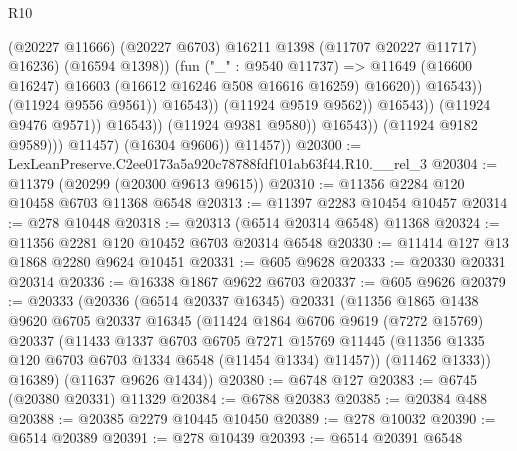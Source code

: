 \begin{lexlean}{R10}
\begin{coremodule}
                                                  (@20227 @11666)
                                                  (@20227 @6703)
                                                  @16211
                                                  @1398
                                                  (@11707 @20227 @11717)
                                                  @16236)
                                                (@16594 @1398))
                                              (fun ("_" : @9540 @11737) =>
                                              @11649
                                                (@16600 @16247)
                                                @16603
                                                (@16612 @16246 @508 @16616 @16259)
                                                @16620))
                                            @16543))
                                        (@11924 @9556 @9561))
                                      @16543))
                                  (@11924 @9519 @9562))
                                @16543))
                            (@11924 @9476 @9571))
                          @16543))
                      (@11924 @9381 @9580))
                    @16543))
                (@11924 @9182 @9589)))
            @11457)
          (@16304 @9606))
        @11457))
@20300 := LexLeanPreserve.C2ee0173a5a920c78788fdf101ab63f44.R10.__rel_3
@20304 := @11379 (@20299 (@20300 @9613 @9615))
@20310 := @11356 @2284 @120 @10458 @6703 @11368 @6548
@20313 := @11397 @2283 @10454 @10457
@20314 := @278 @10448
@20318 := @20313 (@6514 @20314 @6548) @11368
@20324 := @11356 @2281 @120 @10452 @6703 @20314 @6548
@20330 := @11414 @127 @13 @1868 @2280 @9624 @10451
@20331 := @605 @9628
@20333 := @20330 @20331 @20314
@20336 := @16338 @1867 @9622 @6703
@20337 := @605 @9626
@20379 := @20333
    (@20336
      (@6514 @20337 @16345)
      @20331
      (@11356
        @1865
        @1438
        @9620
        @6705
        @20337
        @16345
        (@11424
          @1864
          @6706
          @9619
          (@7272 @15769)
          @20337
          (@11433
            @1337
            @6703
            @6705
            @7271
            @15769
            @11445
            (@11356 @1335 @120 @6703 @6703 @1334 @6548 (@11454 @1334) @11457))
          (@11462 @1333))
        @16389)
      (@11637 @9626 @1434))
@20380 := @6748 @127
@20383 := @6745 (@20380 @20331) @11329
@20384 := @6788 @20383
@20385 := @20384 @488
@20388 := @20385 @2279 @10445 @10450
@20389 := @278 @10032
@20390 := @6514 @20389
@20391 := @278 @10439
@20393 := @6514 @20391 @6548

\end{coremodule}
\end{lexlean}
